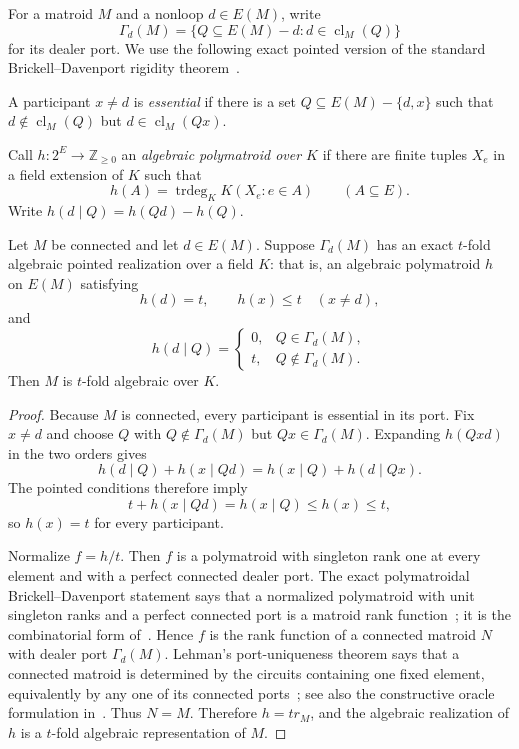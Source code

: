 \documentclass[11pt]{article}
\theoremstyle{definition}
\newcommand{\trdeg}{\operatorname{trdeg}}
\newcommand{\cl}{\operatorname{cl}}
\begin{document}
For a matroid $M$ and a nonloop $d\in E(M)$, write
\[
\Gamma_d(M)=\{Q\subseteq E(M)-d:d\in\cl_M(Q)\}
\]
for its dealer port.  We use the following exact pointed version of the standard Brickell--Davenport rigidity theorem~\cite{BrickellDavenport1991}.

A participant $x\ne d$ is \emph{essential} if there is a set $Q\subseteq E(M)-\{d,x\}$ such that $d\notin\cl_M(Q)$ but $d\in\cl_M(Qx)$.

Call $h:2^E\to\mathbb Z_{\ge0}$ an \emph{algebraic polymatroid over $K$} if there are finite tuples $X_e$ in a field extension of $K$ such that
\[
h(A)=\trdeg_K K(X_e:e\in A)\qquad(A\subseteq E).
\]
Write $h(d\mid Q)=h(Qd)-h(Q)$.

\begin{proposition}\label{prop:port-rigidity}
Let $M$ be connected and let $d\in E(M)$.  Suppose $\Gamma_d(M)$ has an exact $t$-fold algebraic pointed realization over a field $K$: that is, an algebraic polymatroid $h$ on $E(M)$ satisfying
\[
h(d)=t,\qquad h(x)\le t\quad(x\ne d),
\]
and
\[
h(d\mid Q)=
\begin{cases}
0,&Q\in\Gamma_d(M),\\
t,&Q\notin\Gamma_d(M).
\end{cases}
\]
Then $M$ is $t$-fold algebraic over $K$.
\end{proposition}
\begin{proof}
Because $M$ is connected, every participant is essential in its port.  Fix $x\ne d$ and choose $Q$ with $Q\notin\Gamma_d(M)$ but $Qx\in\Gamma_d(M)$.  Expanding $h(Qxd)$ in the two orders gives
\[
h(d\mid Q)+h(x\mid Qd)=h(x\mid Q)+h(d\mid Qx).
\]
The pointed conditions therefore imply
\[
t+h(x\mid Qd)=h(x\mid Q)\le h(x)\le t,
\]
so $h(x)=t$ for every participant.

Normalize $f=h/t$.  Then $f$ is a polymatroid with singleton rank one at every element and with a perfect connected dealer port.  The exact polymatroidal Brickell--Davenport statement says that a normalized polymatroid with unit singleton ranks and a perfect connected port is a matroid rank function~\cite[Theorem~4.1.2]{PadroSecretSharingNotes}; it is the combinatorial form of~\cite[Theorem~1]{BrickellDavenport1991}.  Hence $f$ is the rank function of a connected matroid $N$ with dealer port $\Gamma_d(M)$.  Lehman's port-uniqueness theorem says that a connected matroid is determined by the circuits containing one fixed element, equivalently by any one of its connected ports~\cite{Lehman1964}; see also the constructive oracle formulation in~\cite[p.~190]{CoullardHellerstein1996}.  Thus $N=M$.  Therefore $h=t r_M$, and the algebraic realization of $h$ is a $t$-fold algebraic representation of $M$.
\end{proof}
\end{document}
